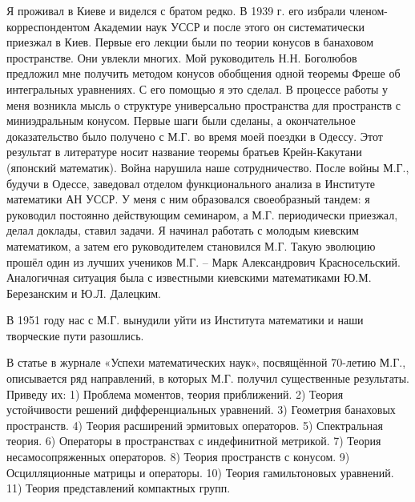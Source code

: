 Я проживал в Киеве и виделся с братом редко. В 1939 г. его избрали членом-корреспондентом Академии наук УССР и после этого он систематически приезжал в Киев. Первые его лекции были по теории конусов в банаховом пространстве. Они увлекли многих. Мой руководитель Н.Н. Боголюбов предложил мне получить методом конусов обобщения одной теоремы Фреше об интегральных уравнениях. С его помощью я это сделал. В процессе работы у меня возникла мысль о структуре универсально пространства для пространств с миниэдральным конусом. Первые шаги были сделаны, а окончательное доказательство было получено с М.Г. во время моей поездки в Одессу. Этот результат в литературе носит название теоремы братьев Крейн-Какутани (японский математик).
Война нарушила наше сотрудничество. После войны М.Г., будучи в Одессе, заведовал отделом функционального анализа в Институте математики АН УССР. У меня с ним образовался своеобразный тандем: я руководил постоянно действующим семинаром, а М.Г. периодически приезжал, делал доклады, ставил задачи. Я начинал работать с молодым киевским математиком, а затем его руководителем становился М.Г. Такую эволюцию прошёл один из лучших учеников М.Г.  – Марк Александрович Красносельский. Аналогичная ситуация была с известными киевскими математиками Ю.М. Березанским и Ю.Л. Далецким.

В 1951 году нас с М.Г. вынудили уйти из Института математики и наши творческие пути разошлись.

В статье в журнале «Успехи математических наук», посвящённой 70-летию М.Г., описывается ряд направлений, в которых М.Г. получил существенные результаты. Приведу их:  1) Проблема моментов, теория приближений. 2) Теория устойчивости решений дифференциальных уравнений. 3) Геометрия банаховых пространств. 4) Теория расширений эрмитовых операторов. 5) Спектральная теория. 6) Операторы в пространствах с индефинитной метрикой. 7) Теория несамосопряженных операторов. 8) Теория пространств с конусом. 9) Осцилляционные матрицы и операторы. 10) Теория гамильтоновых уравнений. 11) Теория представлений компактных групп.

